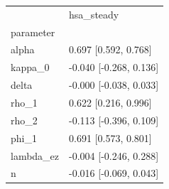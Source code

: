 \begin{tabular}{ll}
\toprule
 & hsa\_steady \\
parameter &  \\
\midrule
alpha & 0.697 [0.592, 0.768] \\
kappa\_0 & -0.040 [-0.268, 0.136] \\
delta & -0.000 [-0.038, 0.033] \\
rho\_1 & 0.622 [0.216, 0.996] \\
rho\_2 & -0.113 [-0.396, 0.109] \\
phi\_1 & 0.691 [0.573, 0.801] \\
lambda\_ez & -0.004 [-0.246, 0.288] \\
n & -0.016 [-0.069, 0.043] \\
\bottomrule
\end{tabular}
